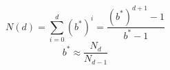 \begin{equation}
    N(d) = \sum_{i=0}^{d} (b^*)^i = \frac{(b^*)^{d+1} - 1}{b^* - 1}
\end{equation}
\begin{equation}
    b^* \approx \frac{N_d}{N_{d-1}}
\end{equation}
